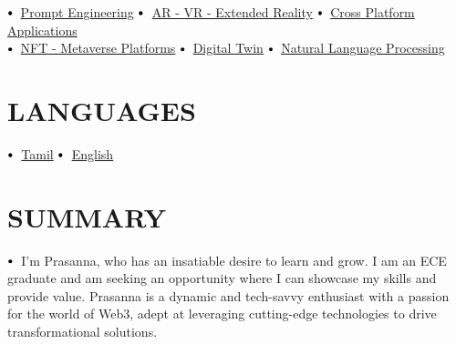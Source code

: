 \documentclass[letterpaper,11pt]{article}
\newcommand\sbullet[1][.5]{\mathbin{\vcenter{\hbox{\scalebox{#1}{$\bullet$}}}}}
\begin{document}
{{{{{$\sbullet[.75] \hspace{0.2cm}${\href{certificateLink.com}{Prompt Engineering}} \hspace{1.85cm}
\vspace{2pt}
$\sbullet[.75] \hspace{0.1cm}$ {\href{certificateLink.com}{AR - VR - Extended Reality}} \hspace{1.25cm}
$\sbullet[.75] \hspace{0.2cm}${\href{certificateLink.com}{Cross Platform Applications}} \\
 \vspace{2pt}
$\sbullet[.75] \hspace{0.2cm}${\href{certificateLink.com}{NFT - Metaverse Platforms}} \hspace{0.55cm}
 \vspace{2pt}
$\sbullet[.75] \hspace{0.2cm}${\href{certificateLink.com}{Digital Twin}} \hspace{4.15cm}
 \vspace{2pt}
$\sbullet[.75] \hspace{0.2cm}${\href{certificateLink.com}{Natural Language Processing}} \hspace{0.5cm}



\section{LANGUAGES}

$\sbullet[.75] \hspace{0.1cm}$ {\href{certificateLink.com}{Tamil}} \hspace{4.45cm}
$\sbullet[.75] \hspace{0.1cm}$ {\href{certificateLink.com}{English}} \hspace{5.6cm}

\section{SUMMARY}
 \vspace{2pt}
$\sbullet[.75] \hspace{0.1cm}$ {I'm Prasanna, who has an insatiable\vspace{2pt} desire to learn and grow. I am an ECE graduate and am seeking an 
\vspace{2pt} opportunity where I can showcase my skills and provide value. Prasanna is a dynamic and tech-savvy enthusiast with a passion for the world of Web3, adept at leveraging cutting-edge technologies \vspace{2pt} to drive \vspace{2pt} transformational solutions.}
\vspace{5pt}

}}}}}
\end{document}
